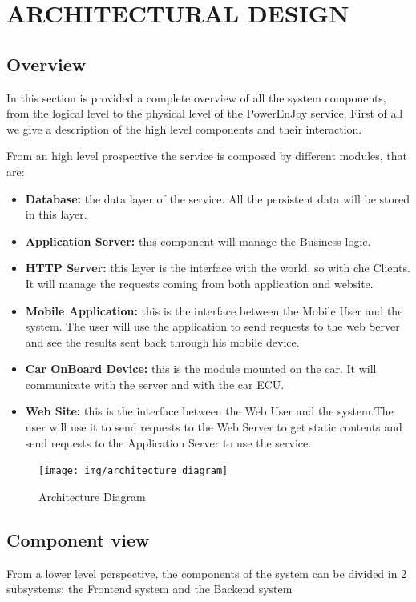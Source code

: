\section{ARCHITECTURAL DESIGN}
\subsection{Overview} 
In this section is provided a complete overview of all the system components, from the logical level to the physical level of the PowerEnJoy service. First of all we give a description of the high level components and their interaction.\newline

\noindent From an high level prospective the service is composed by different modules, that are: \newline


\begin{itemize}
\item{\textbf{Database:}} the data layer of the service. All the persistent data will be stored in this layer.
\item{\textbf{Application Server:}} this component will manage the Business logic.
\item{\textbf{HTTP Server:}} this layer is the interface with the world, so with che Clients. It will manage the requests coming from both application and website.
\item{\textbf{Mobile Application:}} this is the interface between the Mobile User and the system. The user will use the application to send requests to the web Server and see the results sent back through his mobile device. 
\item{\textbf{Car OnBoard Device:}} this is the module mounted on the car. It will communicate with the server and with the car ECU.
\item{\textbf{Web Site:}} this is the interface between the Web User and the system.The user will use it to send requests to the Web Server to get static contents and send requests to the Application Server to use the service.
\end{itemize}

	\begin{figure}[H]	
	\centering
	\texttt{[image: img/architecture\_diagram]}
	\caption{Architecture Diagram}
\end{figure}


\newpage
\subsection{Component view} 
From a lower level perspective, the components of the system can be divided in 2 subsystems: the Frontend system and the Backend system


